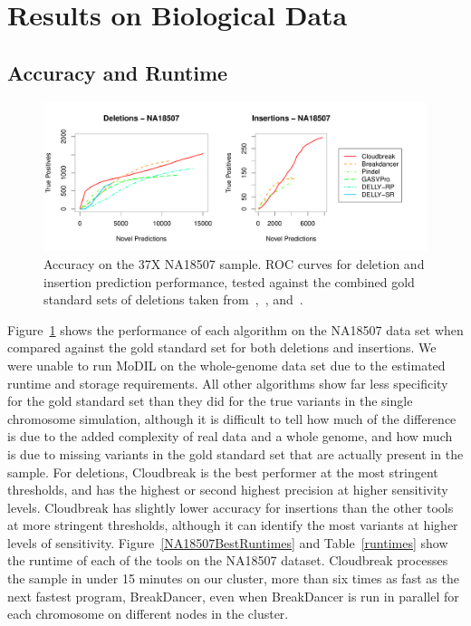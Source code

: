 \section{Results on Biological Data}\label{section_na18507}

\subsection{Accuracy and Runtime}

\begin{figure}
\centering
\includegraphics[width=1\textwidth]{figures/NA18507_COMBINED_ROCS_POSTER.pdf}
\caption{Accuracy on the 37X NA18507 sample. ROC curves for deletion and insertion prediction performance, tested against the combined gold standard sets of deletions taken from~\cite{Kidd:2008p926},~\cite{Mills:2011fi}, and~\cite{GenomesProjectConsortium:2012co}.}
\label{NA18507CombinedRoc}
\end{figure}

Figure~\ref{NA18507CombinedRoc} shows the performance of each algorithm on the NA18507 data set when compared against the gold standard set for both deletions and insertions. We were unable to run MoDIL on the whole-genome data set due to the estimated runtime and storage requirements. All other algorithms show far less specificity for the gold standard set than they did for the true variants in the single chromosome simulation, although it is difficult to tell how much of the difference is due to the added complexity of real data and a whole genome, and how much is due to missing variants in the gold standard set that are actually present in the sample. For deletions, Cloudbreak is the best performer at the most stringent thresholds, and has the highest or second highest precision at higher sensitivity levels. Cloudbreak has slightly lower accuracy for insertions than the other tools at more stringent thresholds, although it can identify the most variants at higher levels of sensitivity. Figure~\ref{NA18507BestRuntimes} and Table~\ref{runtimes} show the runtime of each of the tools on the NA18507 dataset. Cloudbreak processes the sample in under 15 minutes on our cluster, more than six times as fast as the next fastest program, BreakDancer, even when BreakDancer is run in parallel for each chromosome on different nodes in the cluster.

